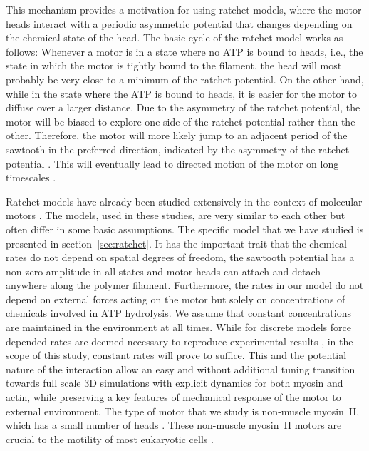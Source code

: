 \documentclass[aps,pre,twocolumn,showpacs,showkeys,superscriptaddress,floatfix]{revtex4-1}
\begin{document}
This mechanism provides a motivation for using ratchet models, 
where the motor heads interact with a periodic asymmetric potential that changes depending on the chemical state of the head. 
The basic cycle of the ratchet model works as follows:
Whenever a motor is in a state where no ATP is bound to heads, i.e., the state in which the motor is tightly bound to the filament, 
the head will most probably be very close to a minimum of the ratchet potential. 
On the other hand, while in the state where the ATP is bound to heads, it is easier for the motor to diffuse over a larger distance. 
Due to the asymmetry of the ratchet potential, the motor will be biased to explore one side of the ratchet potential rather than the other. 
Therefore, the motor will more likely jump to an adjacent period of the sawtooth in the preferred direction, indicated by the asymmetry of the ratchet potential \cite{reimann2002brownian}.
This will eventually lead to directed motion of the motor on long timescales \cite{hoffmann2016molecular,Reimann2002introduction,de2007symmetries}. 


Ratchet models have already been studied extensively in the context of molecular motors \cite{reimann2002brownian,astumian1994fluctuation,astumian1996mechanochemical,julicher1997modeling,Reimann2002introduction,julicher1997spontaneous,peskin1995correlation,huxley1969mechanism,huxley1971proposed}.
The models, used in these studies, are very similar to each other but often differ in some basic assumptions.
The specific model that we have studied is presented in section~\ref{sec:ratchet}. 
It has the important trait that the chemical rates do not depend on spatial degrees of freedom, 
the sawtooth potential has a non-zero amplitude in all states 
and motor heads can attach and detach anywhere along the polymer filament.
Furthermore, the rates in our model do not depend on external forces acting on the motor but solely on concentrations of chemicals involved in ATP hydrolysis. 
We assume that constant concentrations are maintained in the environment at all times.
While for discrete models force depended rates are deemed necessary to reproduce experimental results \cite{sung2017chapter}, 
in the scope of this study, constant rates will prove to suffice.
This and the potential nature of the interaction allow an easy and without additional tuning transition towards full scale 3D simulations with explicit dynamics for both myosin and actin, 
while preserving a key features of mechanical response of the motor to external environment. 
The type of motor that we study is non-muscle myosin~II, which has a small number of heads \cite{pollard1982structure}. 
These non-muscle myosin~II motors are crucial to the motility of most eukaryotic cells \cite{vicente2009non}.
\end{document}
